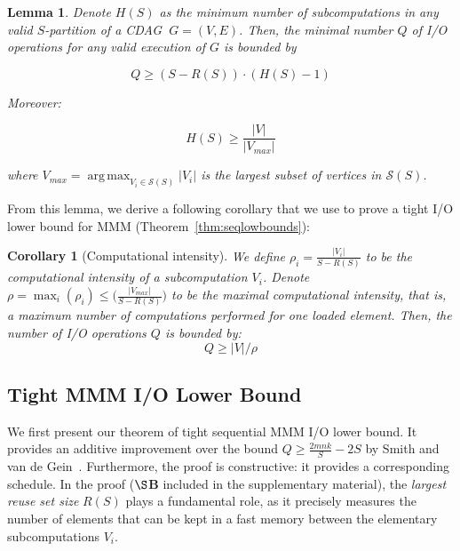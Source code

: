 \documentclass[sigplan,review,anonymous,10pt]{acmart}\settopmatter{printfolios=true,printccs=false,printacmref=false}
\newtheorem*{corollary*}{Corollary}
\DeclareMathOperator*{\argmax}{arg\,max}
\newtheorem{lma}{Lemma}
\begin{document}
\begin{lma}
	\label{lma:reuse}
	Denote $H(S)$ as the minimum number of subcomputations in any valid 
	$S$-partition of a CDAG $\ G=(V,E)$. Then,
	the minimal number $Q$ of I/O operations for any valid execution of $G$ 
	 is bounded by  
	
	\vspace{-1em}
	\begin{equation}
	Q \ge (S - R(S)) \cdot (H(S) - 1)
	\label{eq:reusebound} \end{equation}
	\vspace{-1em}
	
	\noindent
	Moreover: 
	
	\vspace{-1.5em}
	\begin{equation}\label{eq:reusebound-pmax}
	H(S) \ge \frac{|V|}{|V_{max}|}
	\end{equation}
	\vspace{-0.5em}
	
	\noindent
	where $V_{max} = \argmax_{V_i \in \mathcal{S}(S)}|V_i|$ is 
	the largest
	subset of vertices in $\mathcal{S}(S)$.
\end{lma}
 
From this lemma, we derive a following corollary that we use to prove a tight 
I/O lower bound for MMM (Theorem~\ref{thm:seqlowbounds}):

\begin{corollary*}[Computational intensity]
	\label{cor:q}
	We define $\rho_i = \frac{|V_i|}{S - R(S)}$ to be the \emph{computational 
	intensity} 
	of a subcomputation $V_i$.
	Denote $\rho = \max_i(\rho_i) \le \Big(\frac{|V_{max}|}{S-R(S)}\Big)$ to be 
	the \emph{maximal computational intensity}, that is, a maximum number of 
	computations performed for one loaded element. 
	Then, the number of I/O operations $Q$ is bounded by:
	\begin{equation}
	Q \ge {|V|}/{\rho}
	\end{equation} 
\end{corollary*}

\subsection{Tight MMM I/O Lower Bound} 
\label{sec:seqOpt}
We first present our theorem of tight sequential
MMM I/O lower bound. It provides an additive improvement over the bound $Q \ge 
\frac{2mnk}{S} - 2S$ by Smith and van de 
Gein~\cite{tightMMM}. Furthermore, the proof is constructive: it provides a 
corresponding schedule. In the proof ($\S$\textbf{B} included in the 
supplementary material), the \emph{largest reuse set size} $R(S)$ plays a 
fundamental 
role, as it precisely measures the number of elements that can be kept in a 
fast memory between the elementary subcomputations $V_i$.
\end{document}
